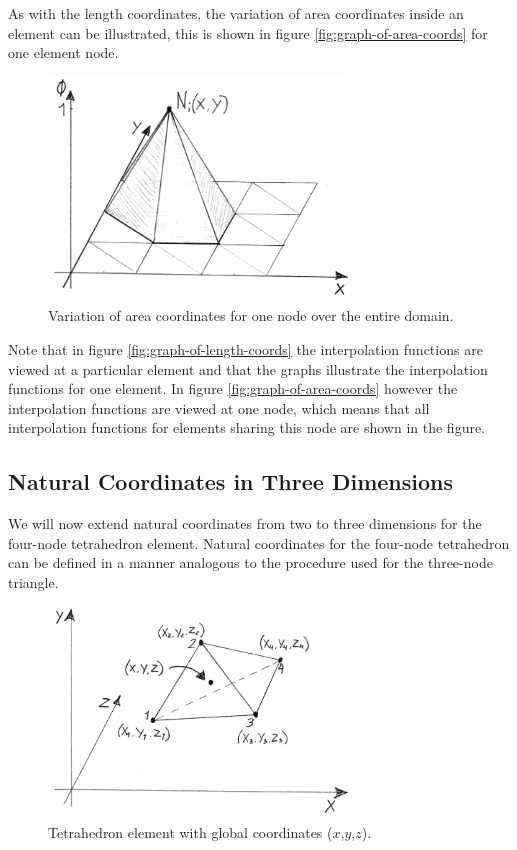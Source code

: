 As with the length coordinates, the variation of area coordinates
inside an element can be illustrated, this is shown in figure
\vref{fig:graph-of-area-coords} for one element node.

\begin{figure}
  \centering
  \includegraphics[width=8cm]{./images/finite_element_method_graph_of_area_coords.png}
\caption{Variation of area coordinates for one node over the entire domain.}
\label{fig:graph-of-area-coords}
\end{figure}

Note that in figure \vref{fig:graph-of-length-coords} the interpolation
functions are viewed at a particular element and that the graphs
illustrate the interpolation functions for one element. In figure
\vref{fig:graph-of-area-coords} however the interpolation functions are
viewed at one node, which means that all interpolation functions for
elements sharing this node are shown in the figure.

\subsection{Natural Coordinates in Three Dimensions}
\label{sec:natural-coordinates-3d}
We will now extend natural coordinates from two to three
dimensions for the four-node tetrahedron element.
%
Natural coordinates for the four-node tetrahedron can be defined in a
manner analogous to the procedure used for the three-node triangle.

\begin{figure}
  \centering
  \includegraphics[width=8cm]{./images/finite_element_method_point_in_tetrahedron.png}
\caption{Tetrahedron element with global coordinates ($x$,$y$,$z$).}
\label{fig:point-in-tetrahedron}
\end{figure}

